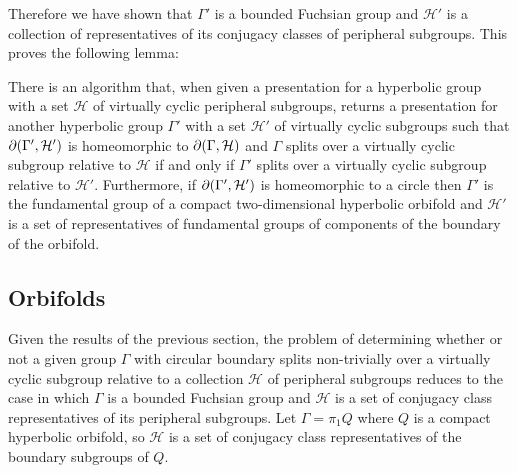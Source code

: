 Therefore we have shown that $\Gamma'$ is a bounded Fuchsian group and
$\mathcal{H}'$ is a collection of representatives of its conjugacy classes of
peripheral subgroups. This proves the following lemma:

\begin{lem}\label{lem:grouptoorbifold} There is an algorithm that, when given a
presentation for a hyperbolic group with a set $\mathcal{H}$ of virtually
cyclic peripheral subgroups, returns a presentation for another hyperbolic
group $\Gamma'$ with a set $\mathcal{H}'$ of virtually cyclic subgroups such
that $\partial(\Gamma', \mathcal{H}')$ is homeomorphic to $\partial(\Gamma,
\mathcal{H})$ and $\Gamma$ splits over a virtually cyclic subgroup relative
to $\mathcal{H}$ if and only if $\Gamma'$ splits over a virtually cyclic
subgroup relative to $\mathcal{H}'$. Furthermore, if $\partial(\Gamma',
\mathcal{H}')$ is homeomorphic to a circle then $\Gamma'$ is the fundamental
group of a compact two-dimensional hyperbolic orbifold and $\mathcal{H}'$ is
a set of representatives of fundamental groups of components of the boundary of
the orbifold.  \end{lem}

\subsection{Orbifolds}

Given the results of the previous section, the problem of determining whether
or not a given group $\Gamma$ with circular boundary splits non-trivially over
a virtually cyclic subgroup relative to a collection $\mathcal{H}$ of
peripheral subgroups reduces to the case in which $\Gamma$ is a bounded
Fuchsian group and $\mathcal{H}$ is a set of conjugacy class representatives of
its peripheral subgroups. Let $\Gamma = \pi_1Q$ where $Q$ is a compact
hyperbolic orbifold, so $\mathcal{H}$ is a set of conjugacy class
representatives of the boundary subgroups of $Q$.

